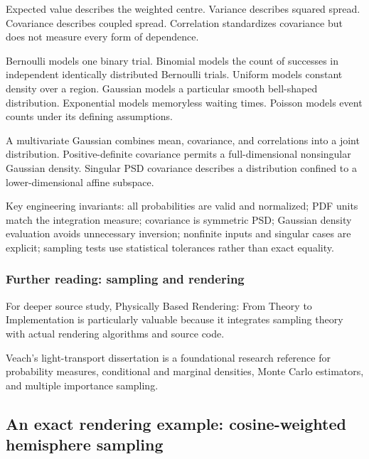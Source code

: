 Expected value describes the weighted centre. Variance describes squared spread. Covariance describes coupled spread. Correlation standardizes covariance but does not measure every form of dependence.

Bernoulli models one binary trial. Binomial models the count of successes in independent identically distributed Bernoulli trials. Uniform models constant density over a region. Gaussian models a particular smooth bell-shaped distribution. Exponential models memoryless waiting times. Poisson models event counts under its defining assumptions.

A multivariate Gaussian combines mean, covariance, and correlations into a joint distribution. Positive-definite covariance permits a full-dimensional nonsingular Gaussian density. Singular PSD covariance describes a distribution confined to a lower-dimensional affine subspace.

Key engineering invariants: all probabilities are valid and normalized; PDF units match the integration measure; covariance is symmetric PSD; Gaussian density evaluation avoids unnecessary inversion; nonfinite inputs and singular cases are explicit; sampling tests use statistical tolerances rather than exact equality.

\subsubsection{Further reading: sampling and rendering}\label{02-foundations-ii-ch031-further-reading-sampling-and-rendering}

\hypertarget{02-foundations-ii-ch031-further-reading-sampling-and-rendering}{}

For deeper source study, Physically Based Rendering: From Theory to Implementation is particularly valuable because it integrates sampling theory with actual rendering algorithms and source code.

Veach's light-transport dissertation is a foundational research reference for probability measures, conditional and marginal densities, Monte Carlo estimators, and multiple importance sampling.

\subsection{An exact rendering example: cosine-weighted hemisphere sampling}\label{02-foundations-ii-ch031-an-exact-rendering-example-cosine-weighted-hemisphere-sampling}

